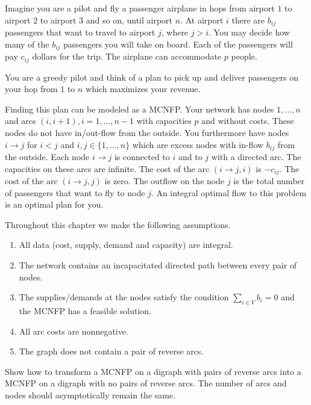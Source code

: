   \begin{example}
    Imagine you are a pilot and fly a passenger airplane in
    hops from airport $1$ to airport $2$ to airport $3$ and so on, 
    until airport $n$.  At airport $i$ there are $b_{ij}$ passengers 
    that want to travel to airport $j$, where $j>i$. You may decide 
    how many of the $b_{ij}$ passengers you will take on board. Each 
    of the passengers will pay $c_{ij}$ dollars for the trip. The 
    airplane can accommodate $p$ people. 

    You are a greedy pilot and think of a plan to pick up and deliver
    passengers on your hop from $1$ to $n$ which maximizes your
    revenue. 

    Finding this plan can be modeled as a MCNFP. 
    Your network has nodes $1,\ldots,n$ and arcs
    $(i,i+1), i=1,\ldots,n-1$ with capacities $p$ and  without
    costs. These nodes do not have  in/out-flow from   the outside. 
    You furthermore have nodes $i\to j$ for $i<j$ and 
    $i,j \in \{1,\ldots,n\}$ which are excess nodes with in-flow 
    $b_{ij}$ from the outside. Each node $i\to j$ is connected to
    $i$ and to $j$ with a directed arc. The capacities on these arcs
    are infinite. The cost of the arc $(i\to j,i)$ is $-c_{ij}$. 
    The cost of the arc $(i\to j,j)$ is zero. The outflow on the 
    node $j$ is the total number of passengers that want to fly to 
    node $j$. An integral optimal flow to this problem is an optimal 
    plan for you. 
  \end{example}


  
  Throughout this chapter we make the following assumptions.
  
  \begin{enumerate}
  \item All data (cost, supply, demand and capacity) are integral.
  \item The network contains an incapacitated directed path between
    every pair of nodes. 
  \item The supplies/demands at the nodes satisfy the condition 
    $\sum_{i \in V} b_i=0$ and the MCNFP has a feasible solution. 
  \item All arc costs are nonnegative. 
  \item The graph does not contain a pair of reverse arcs. 
  \end{enumerate}

\begin{exercise} 
   Show how to transform a MCNFP on a digraph with pairs of 
   reverse arcs into a MCNFP on a digraph with no pairs of 
   reverse arcs.  The number of arcs and nodes should 
   asymptotically remain the same.
\end{exercise}
  
